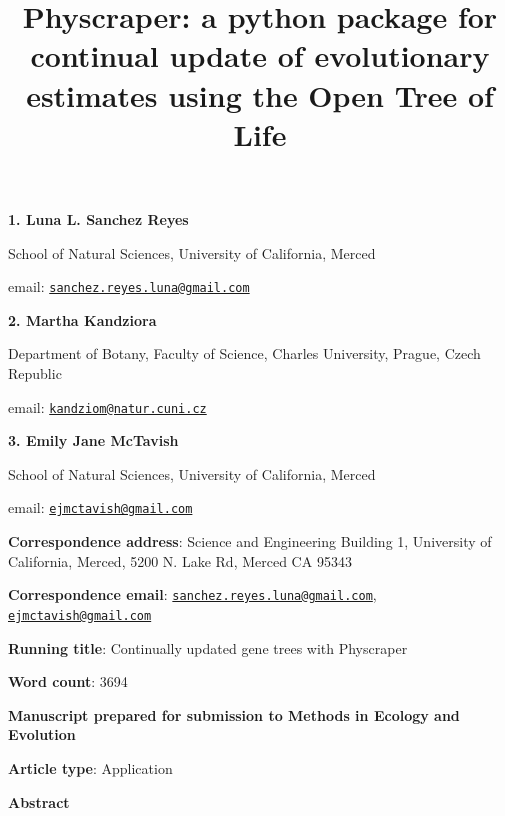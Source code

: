 \documentclass[]{article}
\title{Physcraper: a python package for continual update of evolutionary estimates using the Open Tree of Life}
\author{}
\date{\vspace{-2.5em}}
\begin{document}
\maketitle

\textbf{1. Luna L. Sanchez Reyes}

School of Natural Sciences, University of California, Merced

email: \href{mailto:sanchez.reyes.luna@gmail.com}{\nolinkurl{sanchez.reyes.luna@gmail.com}}

\textbf{2. Martha Kandziora}

Department of Botany, Faculty of Science, Charles University, Prague, Czech Republic

email: \href{mailto:kandziom@natur.cuni.cz}{\nolinkurl{kandziom@natur.cuni.cz}}

\textbf{3. Emily Jane McTavish}

School of Natural Sciences, University of California, Merced

email: \href{mailto:ejmctavish@gmail.com}{\nolinkurl{ejmctavish@gmail.com}}

\textbf{Correspondence address}: Science and Engineering Building 1, University of California, Merced, 5200 N. Lake Rd, Merced CA 95343

\textbf{Correspondence email}: \href{mailto:sanchez.reyes.luna@gmail.com}{\nolinkurl{sanchez.reyes.luna@gmail.com}}, \href{mailto:ejmctavish@gmail.com}{\nolinkurl{ejmctavish@gmail.com}}

\textbf{Running title}: Continually updated gene trees with Physcraper

\textbf{Word count}: 3694

\textbf{Manuscript prepared for submission to Methods in Ecology and Evolution}

\textbf{Article type}: Application

\newpage

\begingroup\Large

\textbf{Abstract}
\endgroup
\end{document}
